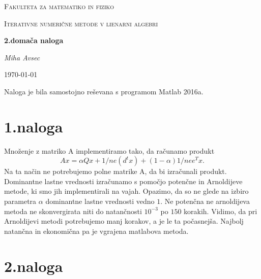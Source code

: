 \documentclass[11pt]{article} %
\begin{document}
\begin{titlepage}
\centering
{\scshape\LARGE Fakulteta za matematiko in fiziko \par}
\vspace{1cm}
{\scshape\Large Iterativne numerične metode v lienarni algebri\par}
\vspace{1.5cm}
{\huge\bfseries 2.domača naloga\par}
\vspace{2cm}
{\Large\itshape Miha Avsec\par}
\vfill

\vfill

{\large \today\par}
\end{titlepage}

Naloga je bila samostojno reševana s programom Matlab 2016a.

\section{1.naloga}

Množenje z matriko A implementiramo tako, da računamo produkt
$$Ax = \alpha Qx + 1/ne(d^tx) + (1-\alpha)1/nee^{T}x.$$
Na ta način ne potrebujemo polne matrike A, da bi izračunali produkt. Dominantne lastne vrednosti izračunamo s pomočjo potenčne in Arnoldijeve metode, ki smo jih implementirali na vajah.
Opazimo, da so ne glede na izbiro parametra $\alpha$ dominantne lastne vrednosti vedno $1$. Ne potenčna ne arnoldijeva metoda ne skonvergirata niti do natančnosti $10^{-3}$ po $150$ korakih. Vidimo, da pri Arnoldijevi metodi potrebujemo manj korakov, a je le ta počasnejša. Najbolj natančna in ekonomična pa je vgrajena matlabova metoda.

\section{2.naloga}
\end{document}
